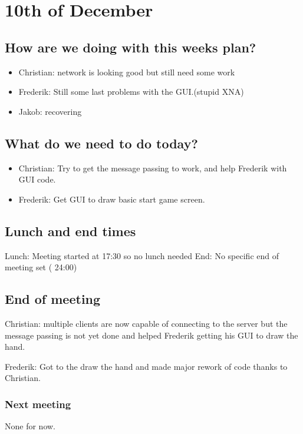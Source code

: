\section{10th of December}
\subsection{How are we doing with this weeks plan?}
\begin{itemize}
\item Christian: network is looking good but still need some work
\item Frederik: Still some last problems with the GUI.(stupid XNA)
\item Jakob: recovering
\end{itemize}

\subsection{What do we need to do today?}
\begin{itemize}
\item Christian: Try to get the message passing to work, and help Frederik with GUI code.
\item Frederik: Get GUI to draw basic start game screen.
\end{itemize}

\subsection{Lunch and end times}
Lunch:
Meeting started at 17:30 so no lunch needed
End:
No specific end of meeting set ( 24:00)
\subsection{End of meeting}
Christian: multiple clients are now capable of connecting to the server but the message passing is not yet done and helped Frederik getting his GUI to draw the hand.

Frederik: Got to the draw the hand and made major rework of code thanks to Christian.
\subsubsection{Next meeting}
None for now.
